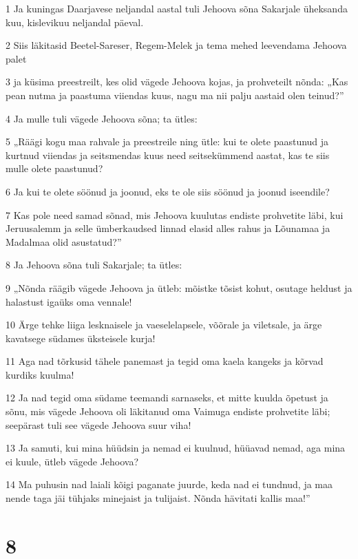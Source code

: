 \par 1 Ja kuningas Daarjavese neljandal aastal tuli Jehoova sõna Sakarjale üheksanda kuu, kislevikuu neljandal päeval.
\par 2 Siis läkitasid Beetel-Sareser, Regem-Melek ja tema mehed leevendama Jehoova palet
\par 3 ja küsima preestreilt, kes olid vägede Jehoova kojas, ja prohveteilt nõnda: „Kas pean nutma ja paastuma viiendas kuus, nagu ma nii palju aastaid olen teinud?”
\par 4 Ja mulle tuli vägede Jehoova sõna; ta ütles:
\par 5 „Räägi kogu maa rahvale ja preestreile ning ütle: kui te olete paastunud ja kurtnud viiendas ja seitsmendas kuus need seitsekümmend aastat, kas te siis mulle olete paastunud?
\par 6 Ja kui te olete söönud ja joonud, eks te ole siis söönud ja joonud iseendile?
\par 7 Kas pole need samad sõnad, mis Jehoova kuulutas endiste prohvetite läbi, kui Jeruusalemm ja selle ümberkaudsed linnad elasid alles rahus ja Lõunamaa ja Madalmaa olid asustatud?”
\par 8 Ja Jehoova sõna tuli Sakarjale; ta ütles:
\par 9 „Nõnda räägib vägede Jehoova ja ütleb: mõistke tõsist kohut, osutage heldust ja halastust igaüks oma vennale!
\par 10 Ärge tehke liiga lesknaisele ja vaeselelapsele, võõrale ja viletsale, ja ärge kavatsege südames üksteisele kurja!
\par 11 Aga nad tõrkusid tähele panemast ja tegid oma kaela kangeks ja kõrvad kurdiks kuulma!
\par 12 Ja nad tegid oma südame teemandi sarnaseks, et mitte kuulda õpetust ja sõnu, mis vägede Jehoova oli läkitanud oma Vaimuga endiste prohvetite läbi; seepärast tuli see vägede Jehoova suur viha!
\par 13 Ja samuti, kui mina hüüdsin ja nemad ei kuulnud, hüüavad nemad, aga mina ei kuule, ütleb vägede Jehoova?
\par 14 Ma puhusin nad laiali kõigi paganate juurde, keda nad ei tundnud, ja maa nende taga jäi tühjaks minejaist ja tulijaist. Nõnda hävitati kallis maa!”


\chapter{8}


